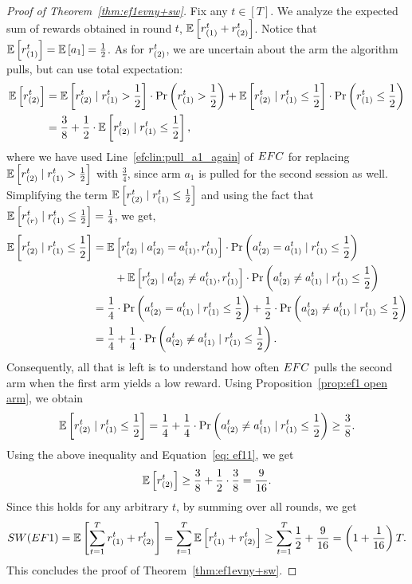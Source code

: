 \begin{proof}[Proof of Theorem~\ref{thm:ef1evny+sw}]
Fix any $t\in[T]$. We analyze the expected sum of rewards obtained in round $t$, $\mathbb{E}\left[ r_{(1)}^t+r_{(2)}^t \right]$.
Notice that $\mathbb{E}\left[ r_{(1)}^t \right] = \mathbb{E}\left[ a_1 \right] = \frac{1}{2}$.
As for $r_{(2)}^t$, we are uncertain about the arm the algorithm pulls, but can use total expectation:
\begin{align}\label{eq: ef11}
    \mathbb{E}\left[ r_{(2)}^t \right] & = \mathbb{E}\left[ r_{(2)}^t \mid r_{(1)}^t > \frac{1}{2} \right]\cdot \Pr\left( r_{(1)}^t > \frac{1}{2} \right) +  \mathbb{E}\left[ r_{(2)}^t \mid r_{(1)}^t \leq \frac{1}{2} \right]\cdot \Pr\left( r_{(1)}^t \leq \frac{1}{2} \right)
    \nonumber\\&= \frac{3}{8} + \frac{1}{2}\cdot \mathbb{E}\left[ r_{(2)}^t \mid r_{(1)}^t \leq \frac{1}{2} \right],
\end{align}
where we have used Line~\ref{efclin:pull_a1_again} of $EFC$ for replacing $\mathbb{E}\left[ r_{(2)}^t \mid r_{(1)}^t > \frac{1}{2} \right]$ with $\frac{3}{4}$, since arm $a_1$ is pulled for the second session as well. Simplifying the term $\mathbb{E}\left[ r_{(2)}^t \mid r_{(1)}^t \leq \frac{1}{2} \right]$ and using the fact that $\mathbb{E}\left[ r_{(r)}^t \mid r_{(1)}^t \leq \frac{1}{2} \right]=\frac{1}{4}$, we get,
\begin{align*}
    \mathbb{E}\left[ r_{(2)}^t \mid r_{(1)}^t \leq \frac{1}{2} \right] &
    = \mathbb{E}\left[ r_{(2)}^t \mid a_{(2)}^t = a_{(1)}^t, r_{(1)}^t \right] \cdot \Pr\left( a_{(2)}^t = a_{(1)}^t \mid r_{(1)}^t \leq \frac{1}{2} \right)
    \\& \qquad + \mathbb{E}\left[ r_{(2)}^t \mid a_{(2)}^t \neq a_{(1)}^t, r_{(1)}^t \right] \cdot \Pr\left( a_{(2)}^t \neq a_{(1)}^t \mid r_{(1)}^t \leq \frac{1}{2} \right)
    \\&= \frac{1}{4} \cdot \Pr\left( a_{(2)}^t = a_{(1)}^t \mid r_{(1)}^t \leq \frac{1}{2} \right) + \frac{1}{2} \cdot \Pr\left( a_{(2)}^t \neq a_{(1)}^t \mid r_{(1)}^t \leq \frac{1}{2} \right)
    \\& = \frac{1}{4} + \frac{1}{4}\cdot \Pr\left( a_{(2)}^t \neq a_{(1)}^t \mid r_{(1)}^t \leq \frac{1}{2} \right).
\end{align*}
Consequently, all that is left is to understand how often $EFC$ pulls the second arm when the first arm yields a low reward. Using Proposition~\ref{prop:ef1 open arm}, we obtain
\[
\mathbb{E}\left[ r_{(2)}^t \mid r_{(1)}^t \leq \frac{1}{2} \right] =
\frac{1}{4} + \frac{1}{4} \cdot \Pr\left( a_{(2)}^t \neq a_{(1)}^t \mid r_{(1)}^t \leq \frac{1}{2} \right) \geq \frac{3}{8}.
\]
Using the above inequality and Equation~\eqref{eq: ef11}, we get
\[
\mathbb{E}\left[ r_{(2)}^t \right] \geq \frac{3}{8} + \frac{1}{2}\cdot \frac{3}{8}= \frac{9}{16}.
\]
Since this holds for any arbitrary $t$, by summing over all rounds, we get
\[
SW(EF1) = \mathbb{E}\left[ \sum_{t=1}^{T}{ r_{(1)}^t + r_{(2)}^t } \right] = \sum_{t=1}^{T}{ \mathbb{E}\left[  r_{(1)}^t + r_{(2)}^t  \right] } \geq \sum_{t=1}^{T}{ \frac{1}{2} + \frac{9}{16}} = \left( 1+ \frac{1}{16} \right)T.
\]
This concludes the proof of Theorem~\ref{thm:ef1evny+sw}.
\end{proof}


